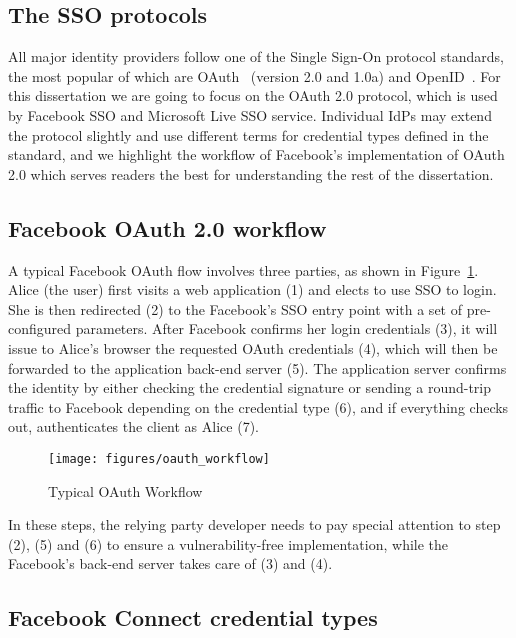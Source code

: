 \subsection{The SSO protocols}

All major identity providers follow one of the Single Sign-On protocol standards, the most popular of which are OAuth~\cite{OAuth2.0} (version 2.0 and 1.0a) and OpenID~\cite{openID}.  For this dissertation we are going to focus on the OAuth 2.0 protocol, which is used by Facebook SSO and Microsoft Live SSO service.  Individual IdPs may extend the protocol slightly and use different terms for credential types defined in the standard, and we highlight the workflow of Facebook's implementation of OAuth 2.0 which serves readers the best for understanding the rest of the dissertation.

\subsection{Facebook OAuth 2.0 workflow}

A typical Facebook OAuth flow involves three parties, as shown in Figure~\ref{fig:oauth_workflow}.  Alice (the user) first visits a web application (1) and elects to use SSO to login.  She is then redirected (2) to the Facebook's SSO entry point with a set of pre-configured parameters.  After Facebook confirms her login credentials (3), it will issue to Alice's browser the requested OAuth credentials (4), which will then be forwarded to the application back-end server (5).  The application server confirms the identity by either checking the credential signature or sending a round-trip traffic to Facebook depending on the credential type (6), and if everything checks out, authenticates the client as Alice (7).

\begin{figure}[bth]
\centering
\texttt{[image: figures/oauth\_workflow]}
\caption{Typical OAuth Workflow}
\label{fig:oauth_workflow}
\end{figure}

In these steps, the relying party developer needs to pay special attention to step (2), (5) and (6) to ensure a vulnerability-free implementation, while the Facebook's back-end server takes care of (3) and (4).

\subsection{Facebook Connect credential types}


